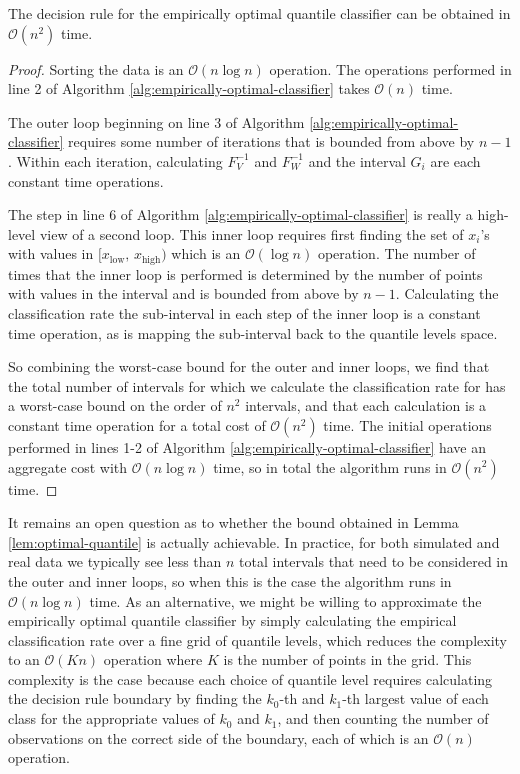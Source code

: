 \begin{lemma}
  \label{lem:optimal-quantile}
  The decision rule for the empirically optimal quantile classifier can be
  obtained in $\mathcal{O}(n^2)$ time.
\end{lemma}

\begin{proof}
  Sorting the data is an $\mathcal{O}(n \log n)$ operation.  The operations
  performed in line 2 of Algorithm \ref{alg:empirically-optimal-classifier}
  takes $\mathcal{O}(n)$ time.

  The outer loop beginning on line 3 of Algorithm
  \ref{alg:empirically-optimal-classifier} requires some number of iterations
  that is bounded from above by $n - 1$.  Within each iteration, calculating
  $F_V^{-1}$ and $F_W^{-1}$ and the interval $G_i$ are each constant time
  operations.

  The step in line 6 of Algorithm \ref{alg:empirically-optimal-classifier} is
  really a high-level view of a second loop.  This inner loop requires first
  finding the set of $x_i$'s with values in
  $\big[x_{\scriptscriptstyle\text{low}},\,
  x_{\scriptscriptstyle\text{high}}\big)$ which is an $\mathcal{O}(\log n)$
  operation.  The number of times that the inner loop is performed is determined
  by the number of points with values in the interval and is bounded from above
  by $n - 1$.  Calculating the classification rate the sub-interval in each step
  of the inner loop is a constant time operation, as is mapping the sub-interval
  back to the quantile levels space.

  So combining the worst-case bound for the outer and inner loops, we find that
  the total number of intervals for which we calculate the classification rate
  for has a worst-case bound on the order of $n^2$ intervals, and that each
  calculation is a constant time operation for a total cost of
  $\mathcal{O}(n^2)$ time.  The initial operations performed in lines 1-2 of
  Algorithm \ref{alg:empirically-optimal-classifier} have an aggregate cost with
  $\mathcal{O}(n \log n)$ time, so in total the algorithm runs in
  $\mathcal{O}(n^2)$ time.
\end{proof}

It remains an open question as to whether the bound obtained in Lemma
\ref{lem:optimal-quantile} is actually achievable.  In practice, for both
simulated and real data we typically see less than $n$ total intervals that need
to be considered in the outer and inner loops, so when this is the case the
algorithm runs in $\mathcal{O}(n \log n)$ time.  As an alternative, we might be
willing to approximate the empirically optimal quantile classifier by simply
calculating the empirical classification rate over a fine grid of quantile
levels, which reduces the complexity to an $\mathcal{O}(Kn)$ operation where $K$
is the number of points in the grid.  This complexity is the case because each
choice of quantile level requires calculating the decision rule boundary by
finding the $k_0$-th and $k_1$-th largest value of each class for the
appropriate values of $k_0$ and $k_1$, and then counting the number of
observations on the correct side of the boundary, each of which is an
$\mathcal{O}(n)$ operation.




